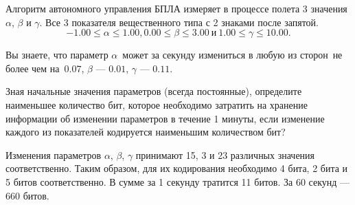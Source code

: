 
Алгоритм автономного управления БПЛА измеряет в процессе полета 3 значения $\alpha$, $\beta$ и $\gamma$. Все 3 показателя вещественного типа с 2 знаками после запятой. $$-1.00\leq \alpha\leq 1.00, 0.00\leq\beta\leq 3.00 \: \text{и} \: 1.00\leq\gamma\leq10.00.$$

Вы знаете, что параметр $\alpha$ может за секунду измениться в любую из сторон не более чем на $0.07$, $\beta$ — $0.01$, $\gamma$ — $0.11$.

Зная начальные значения параметров (всегда постоянные), определите наименьшее количество бит, которое необходимо затратить на хранение информации об изменении параметров в течение 1 минуты, если изменение каждого из показателей кодируется наименьшим количеством бит?

\solutionSection

Изменения параметров $\alpha$, $\beta$, $\gamma$ принимают 15, 3 и 23 различных значения соответственно. Таким образом, для их кодирования необходимо 4 бита, 2 бита и 5 битов соответственно. В сумме за 1 секунду тратится 11 битов. За 60 секунд — 660 битов. 

